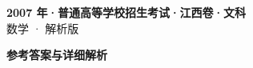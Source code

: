 \documentclass[zihao=-4, a4paper]{ctexart}
\begin{document}
\begin{center}
  {\Large\bfseries 2007 年·普通高等学校招生考试·江西卷·文科}\\[4pt]
  {\large 数学 · 解析版}
\end{center}
\medskip
{}

\clearpage
{}
\begin{center}{\Large\bfseries 参考答案与详细解析}\end{center}
\medskip

\end{document}
